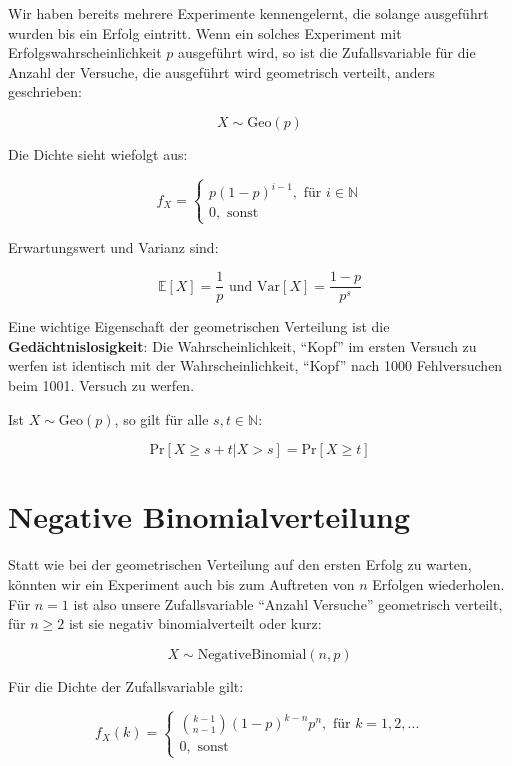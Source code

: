 Wir haben bereits mehrere Experimente kennengelernt, die solange ausgeführt wurden bis ein Erfolg 
eintritt. Wenn ein solches Experiment mit Erfolgswahrscheinlichkeit $p$ ausgeführt wird, so ist die 
Zufallsvariable für die Anzahl der Versuche, die ausgeführt wird geometrisch verteilt, anders geschrieben:

$$X \sim \text{Geo}(p)$$

Die Dichte sieht wiefolgt aus:

$$f_X = \begin{cases}
    p(1-p)^{i-1} , \text{   für } i \in \mathbb{N} \\
    0, \text{   sonst}
\end{cases}$$

Erwartungswert und Varianz sind:

$$\mathbb{E}[X] = \frac{1}{p} \text{ und Var}[X] = \frac{1-p}{p^s} $$

Eine wichtige Eigenschaft der geometrischen Verteilung ist die \textbf{Gedächtnislosigkeit}: Die 
Wahrscheinlichkeit, “Kopf” im ersten Versuch zu werfen ist identisch mit der Wahrscheinlichkeit, 
“Kopf” nach 1000 Fehlversuchen beim 1001. Versuch zu werfen. 

\begin{satz}[Gedächtnislosigkeit]
    Ist $X \sim \text{Geo}(p)$, so gilt für alle $s,t \in \mathbb{N}$:

    $$\text{Pr}[X \geq s + t | X > s] = \text{Pr}[X \geq t]$$
\end{satz}

\section{Negative Binomialverteilung}

Statt wie bei der geometrischen Verteilung auf den ersten Erfolg zu warten, könnten wir ein Experiment 
auch bis zum Auftreten von $n$ Erfolgen wiederholen. Für $n = 1$ ist also unsere Zufallsvariable 
“Anzahl Versuche” geometrisch verteilt, für $n \geq 2$ ist sie negativ binomialverteilt oder kurz:

$$X \sim \text{NegativeBinomial}(n,p)$$

Für die Dichte der Zufallsvariable gilt:

$$f_X(k) = \begin{cases}
    \binom{k-1}{n-1}(1-p)^{k-n}p^n , \text{   für } k = 1, 2, ... \\
    0, \text{   sonst}
\end{cases}$$

